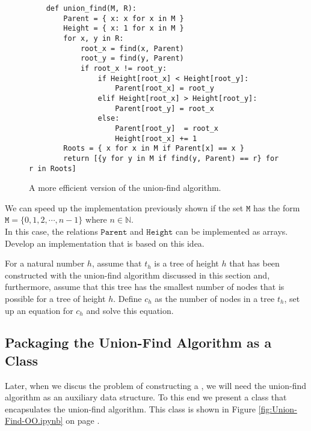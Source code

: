 \begin{figure}[!ht]
\centering
\begin{verbatim}
    def union_find(M, R):
        Parent = { x: x for x in M } 
        Height = { x: 1 for x in M }
        for x, y in R:
            root_x = find(x, Parent)
            root_y = find(y, Parent)
            if root_x != root_y:
                if Height[root_x] < Height[root_y]:
                    Parent[root_x] = root_y
                elif Height[root_x] > Height[root_y]:
                    Parent[root_y] = root_x
                else:
                    Parent[root_y]  = root_x
                    Height[root_x] += 1
        Roots = { x for x in M if Parent[x] == x }
        return [{y for y in M if find(y, Parent) == r} for r in Roots]
\end{verbatim}
\vspace*{-0.3cm}
\caption{A more efficient version of the union-find algorithm.}
\label{fig:Union-Find.ipynb}
\end{figure}

\exercise
We can speed up the implementation previously shown if the set $\texttt{M}$ has the form
\\[0.2cm]
\hspace*{1.3cm}
$\texttt{M} = \{ 0, 1, 2, \cdots, n-1 \}$ \quad where $n \in \mathbb{N}$.
\\[0.2cm]
In this case, the relations $\texttt{Parent}$ and $\texttt{Height}$ can be implemented as arrays.
Develop an implementation that is based on this idea.
\eox

\exercise
For a natural number $h$, assume that $t_h$ is a tree of height $h$ that has been constructed with the union-find algorithm
discussed in this section and, furthermore, assume that this tree has the smallest number of nodes that is
possible for a tree of height $h$.  Define $c_h$ as the number of nodes in a tree $t_h$, set up an equation for
$c_h$ and solve this equation. \eox


\subsection{Packaging the  Union-Find Algorithm as a Class \label{sec:union-find-oo}}
Later, when we discus the problem of constructing a , we will need the union-find algorithm as an
auxiliary data structure.  To this end we present a class that encapsulates the union-find
algorithm.  This class is shown in Figure \ref{fig:Union-Find-OO.ipynb} on page
\pageref{fig:Union-Find-OO.ipynb}.

